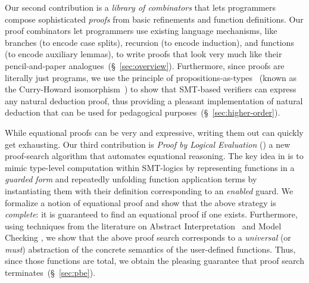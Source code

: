 %
%
Our second contribution is a
\emph{library of combinators}
that lets programmers compose
sophisticated \emph{proofs}
from basic refinements and
function definitions.
%
Our proof combinators let programmers
use existing language mechanisms, like
branches (to encode case splits),
recursion (to encode induction), and
functions (to encode auxiliary lemmas),
to write proofs that look very much like
their pencil-and-paper
analogues~(\S~\ref{sec:overview}).
%
Furthermore, since proofs are literally
just programs, we use the principle of
propositions-as-types~\cite{Wadler15} 
(known as the Curry-Howard isomorphism~\cite{CHIso})
to show
that SMT-based verifiers can
express any natural deduction proof, 
thus providing a pleasant
implementation of
natural deduction
that can be used for
pedagogical purposes~(\S~\ref{sec:higher-order}).

%
While equational proofs can be very \elegant
and expressive, writing them out can
quickly get exhausting.
%
Our third contribution is
\emph{Proof by Logical Evaluation} (\pbesym)
a new proof-search algorithm
that automates
equational reasoning.
%
The key idea in \pbesym is to mimic
type-level computation within SMT-logics
by representing functions in a
\emph{guarded form} \cite{Dijkstra1975}
and repeatedly unfolding function application
terms by instantiating them with their definition
corresponding to an \emph{enabled} guard.
%
We formalize a notion of equational proof
and show that the above strategy is
\emph{complete}: \ie it is guaranteed
to find an equational proof if one exists.
%
Furthermore, using techniques from
the literature on Abstract
Interpretation~\cite{CousotCousot77}
and Model Checking \cite{CGL92},
we show that the above proof search
corresponds to a \emph{universal}
(or \emph{must}) abstraction of
the concrete semantics of the
user-defined functions.
%
Thus, since those functions are total,
we obtain the pleasing
guarantee that proof search
terminates~(\S~\ref{sec:pbe}).

